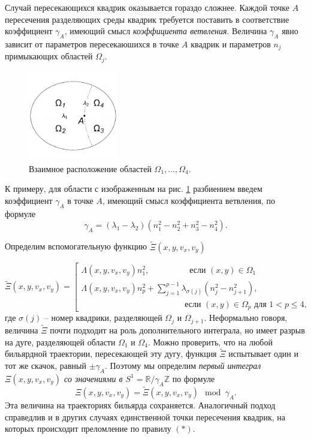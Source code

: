 Случай пересекающихся квадрик оказывается гораздо сложнее. Каждой точке $A$ пересечения разделяющих среды квадрик требуется поставить в соответствие коэффициент $\gamma_A$, имеющий смысл \textit{коэффициента ветвления}. Величина $\gamma_A$ явно зависит от параметров пересекаюшихся в точке $A$ квадрик и параметров $n_j$ примыкающих областей $\Omega_j$.

\begin{figure}[!htb]
\centering
     \includegraphics[width=0.35\textwidth]{images/ch4/section1/img2.pdf}
\caption{Взаимное расположение областей $\Omega_1,\ldots,\Omega_4$.}
    \label{fig:intro_example6}
\end{figure}

К примеру, для области с изображенным на рис. \ref{fig:intro_example6} разбиением введем коэффициент $\gamma_A$ в точке $A$, имеющий смысл коэффициента ветвления, по формуле $$\gamma_A = (\lambda_1 - \lambda_2) ( n_1^2 - n_2^2 + n_3^2 - n_4^2).$$

Определим вспомогательную функцию $\widetilde{\Xi}(x, y, v_x, v_y)$ 

\begin{equation*}
\widetilde{\Xi}(x, y, v_x, v_y) = \left[
\begin{array}{ll}
    \Lambda(x, y, v_x, v_y) n_1^2, \qquad  \  \ \qquad   \text{ если } (x,y) \in \Omega_1 
    \\
    \Lambda(x, y, v_x, v_y) n_p^2 + \sum_{j=1}^{p-1} \lambda_{\sigma(j)}(n_j^2-n_{j+1}^2), \\
     \qquad \qquad \qquad \qquad \qquad \qquad  \text{ если } (x,y) \in \Omega_p \text{ для } 1 < p \leq 4,
\end{array}
\right.
\end{equation*}
где $\sigma(j)$ -- номер квадрики, разделяющей $\Omega_j$ и $\Omega_{j+1}$. 
Неформально говоря, величина $\widetilde{\Xi}$ почти подходит на роль дополнительного интеграла, но имеет разрыв на дуге, разделяющей области $\Omega_1$ и $\Omega_4$. Можно проверить, что на любой бильярдной траектории, пересекающей эту дугу, функция $\widetilde{\Xi}$ испытывает один и тот же скачок, равный  $\pm \gamma_A$. 
Поэтому мы определим \textit{первый интеграл $\Xi(x, y, v_x, v_y)$ со значениями в $S^1= \mathbb{R}/\gamma_A \mathbb{Z}$ }по формуле $$\Xi(x, y, v_x, v_y) = \widetilde{\Xi}(x, y, v_x, v_y) \mod \gamma_A.$$
Эта величина на траекториях бильярда сохраняется.
Аналогичный подход справедлив и в других случаях единственной точки пересечения квадрик, на которых происходит преломление по правилу $(\ast)$.

